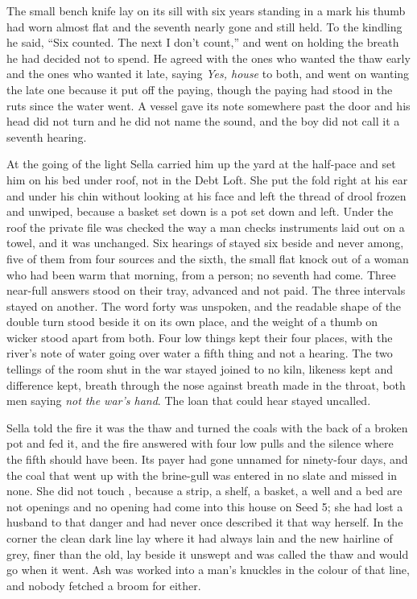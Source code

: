 The small bench knife lay on its sill with six years standing in a mark his thumb had worn almost flat and the seventh nearly gone and still held. To the kindling he said, “Six counted. The next I don't count,” and went on holding the breath he had decided not to spend. He agreed with the ones who wanted the thaw early and the ones who wanted it late, saying \emph{Yes, house} to both, and went on wanting the late one because it put off the paying, though the paying had stood in the ruts since the water went. A vessel gave its note somewhere past the door and his head did not turn and he did not name the sound, and the boy did not call it a seventh hearing.

\scenebreak

At the going of the light Sella carried him up the yard at the half-pace and set him on his bed under  roof, not in the Debt Loft. She put the fold right at his ear and under his chin without looking at his face and left the thread of drool frozen and unwiped, because a basket set down is a pot set down and left. Under the roof the private file was checked the way a man checks instruments laid out on a towel, and it was unchanged. Six hearings of  stayed six beside and never among, five of them from four sources and the sixth, the small flat knock out of a woman who had been warm that morning, from a person; no seventh had come. Three near-full answers stood on their tray, advanced and not paid. The three intervals stayed on another. The word forty was unspoken, and the readable shape of the double turn stood beside it on its own place, and the weight of a thumb on wicker stood apart from both. Four low things kept their four places, with the river's note of water going over water a fifth thing and not a hearing. The two tellings of the room shut in the war stayed joined to no kiln, likeness kept and difference kept, breath through the nose against breath made in the throat, both men saying \emph{not the war's hand}. The loan that could hear stayed uncalled.

Sella told the fire it was the thaw and turned the coals with the back of a broken pot and fed it, and the fire answered with four low pulls and the silence where the fifth should have been. Its payer had gone unnamed for ninety-four days, and the coal that went up with the brine-gull was entered in no slate and missed in none. She did not touch , because a strip, a shelf, a basket, a well and a bed are not openings and no opening had come into this house on Seed 5; she had lost a husband to that danger and had never once described it that way herself. In the corner the clean dark line lay where it had always lain and the new hairline of grey, finer than the old, lay beside it unswept and was called the thaw and would go when it went. Ash was worked into a man's knuckles in the colour of that line, and nobody fetched a broom for either.

